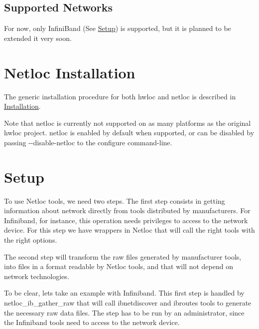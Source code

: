  \hypertarget{a00396_supportednetworks}{}\subsection{Supported Networks}\label{a00396_supportednetworks}
For now, only Infini\+Band (See \hyperlink{a00396_netloc_setup}{Setup}) is supported, but it is planned to be extended it very soon.

 \hypertarget{a00396_netloc_installation}{}\section{Netloc Installation}\label{a00396_netloc_installation}
The generic installation procedure for both hwloc and netloc is described in \hyperlink{index_common_installation}{Installation}.

Note that netloc is currently not supported on as many platforms as the original hwloc project. netloc is enabled by default when supported, or can be disabled by passing {\ttfamily -\/-\/disable-\/netloc} to the configure command-\/line.

 \hypertarget{a00396_netloc_setup}{}\section{Setup}\label{a00396_netloc_setup}
To use Netloc tools, we need two steps. The first step consists in getting information about network directly from tools distributed by manufacturers. For Infiniband, for instance, this operation needs privileges to access to the network device. For this step we have wrappers in Netloc that will call the right tools with the right options.

The second step will transform the raw files generated by manufacturer tools, into files in a format readable by Netloc tools, and that will not depend on network technologies.

To be clear, let\textquotesingle{}s take an example with Infiniband. This first step is handled by {\ttfamily netloc\+\_\+ib\+\_\+gather\+\_\+raw} that will call {\ttfamily ibnetdiscover} and {\ttfamily ibroutes} tools to generate the necessary raw data files. The step has to be run by an administrator, since the Infiniband tools need to access to the network device.

